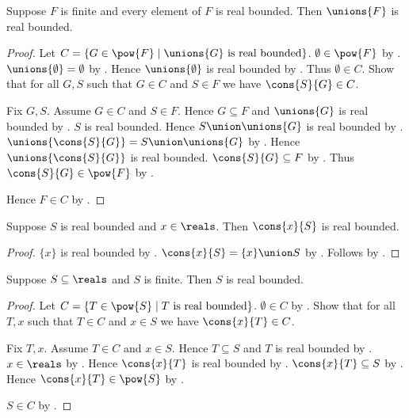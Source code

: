 \begin{theorem}\label{unions_of_finite_real_bounded_family}
    Suppose $F$ is finite and every element of $F$ is real bounded.
    Then $\unions{F}$ is real bounded.
\end{theorem}
\begin{proof}
    Let $C=\{G\in\pow{F}\mid
        \text{$\unions{G}$ is real bounded}\}$.
    $\emptyset\in\pow{F}$ by .
    $\unions{\emptyset}=\emptyset$ by .
    Hence $\unions{\emptyset}$ is real bounded by
        .
    Thus $\emptyset\in C$.
    Show that for all $G,S$ such that $G\in C$ and $S\in F$ we have
        $\cons{S}{G}\in C$.
    \begin{subproof}
        Fix $G,S$.
        Assume $G\in C$ and $S\in F$.
        Hence $G\subseteq F$ and $\unions{G}$ is real bounded by
            .
        $S$ is real bounded.
        Hence $S\union\unions{G}$ is real bounded by
            .
        $\unions{\cons{S}{G}}=S\union\unions{G}$ by
            .
        Hence $\unions{\cons{S}{G}}$ is real bounded.
        $\cons{S}{G}\subseteq F$ by .
        Thus $\cons{S}{G}\in\pow{F}$ by .
    \end{subproof}
    Hence $F\in C$ by .
\end{proof}

\begin{proposition}\label{real_bounded_cons}
    Suppose $S$ is real bounded and $x\in\reals$.
    Then $\cons{x}{S}$ is real bounded.
\end{proposition}
\begin{proof}
    $\{x\}$ is real bounded by .
    $\cons{x}{S}=\{x\}\union S$ by
        .
    Follows by .
\end{proof}

\begin{theorem}\label{finite_real_set_is_bounded}
    Suppose $S\subseteq\reals$ and $S$ is finite.
    Then $S$ is real bounded.
\end{theorem}
\begin{proof}
    Let $C=\{T\in\pow{S}\mid \text{$T$ is real bounded}\}$.
    $\emptyset\in C$ by
        .
    Show that for all $T,x$ such that $T\in C$ and $x\in S$ we have
        $\cons{x}{T}\in C$.
    \begin{subproof}
        Fix $T,x$.
        Assume $T\in C$ and $x\in S$.
        Hence $T\subseteq S$ and $T$ is real bounded by
            .
        $x\in\reals$ by .
        Hence $\cons{x}{T}$ is real bounded by .
        $\cons{x}{T}\subseteq S$ by .
        Hence $\cons{x}{T}\in\pow{S}$ by .
    \end{subproof}
    $S\in C$ by .
\end{proof}


